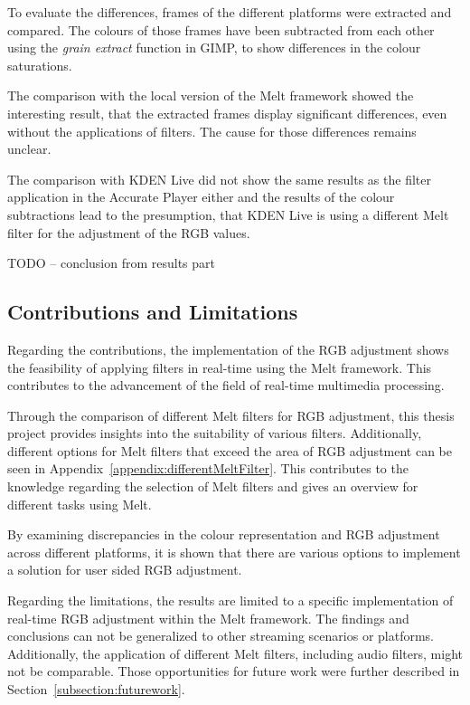 \documentclass[../MasterThesis.tex]{subfiles}
\begin{document}
To evaluate the differences, frames of the different platforms were extracted and compared. 
The colours of those frames have been subtracted from each other using the \textit{grain extract} function in GIMP, to show differences in the colour saturations.


The comparison with the local version of the Melt framework showed the interesting result, that the extracted frames display significant differences, even without the applications of filters. The cause for those differences remains unclear.

The comparison with KDEN Live did not show the same results as the filter application in the Accurate Player either and the results of the colour subtractions lead to the presumption, that KDEN Live is using a different Melt filter for the adjustment of the RGB values.

TODO -- conclusion from results part 




\subsection{Contributions and Limitations} \label{subsection:contributionslimitations}



Regarding the contributions, the implementation of the RGB adjustment shows the feasibility of applying filters in real-time using the Melt framework.
This contributes to the advancement of the field of real-time multimedia processing.


Through the comparison of different Melt filters for RGB adjustment, this thesis project provides insights into the suitability of various filters. Additionally, different options for Melt filters that exceed the area of RGB adjustment can be seen in Appendix~\ref{appendix:differentMeltFilter}.
This contributes to the knowledge regarding the selection of Melt filters and gives an overview for different tasks using Melt.


By examining discrepancies in the colour representation and RGB adjustment across different platforms, it is shown that there are various options to implement a solution for user sided RGB adjustment.


Regarding the limitations, the results are limited to a specific implementation of real-time RGB adjustment within the Melt framework. The findings and conclusions can not be generalized to other streaming scenarios or platforms. Additionally, the application of different Melt filters, including audio filters, might not be comparable. Those opportunities for future work were further described in Section~\ref{subsection:futurework}.
\end{document}
